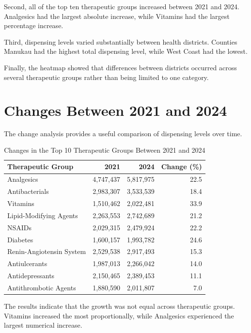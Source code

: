 \documentclass[11pt,a4paper]{report}
\begin{document}
Second, all of the top ten therapeutic groups increased between 2021 and 2024. Analgesics had the largest absolute increase, while Vitamins had the largest percentage increase.

Third, dispensing levels varied substantially between health districts. Counties Manukau had the highest total dispensing level, while West Coast had the lowest.

Finally, the heatmap showed that differences between districts occurred across several therapeutic groups rather than being limited to one category.

\section{Changes Between 2021 and 2024}

The change analysis provides a useful comparison of dispensing levels over time.

\begin{table}[H]
\centering
\caption{Changes in the Top 10 Therapeutic Groups Between 2021 and 2024}
\label{tab:change}
\begin{tabular}{lrrr}
\toprule
\textbf{Therapeutic Group} &
\textbf{2021} &
\textbf{2024} &
\textbf{Change (\%)} \\
\midrule
Analgesics & 4,747,437 & 5,817,975 & 22.5 \\
Antibacterials & 2,983,307 & 3,533,539 & 18.4 \\
Vitamins & 1,510,462 & 2,022,481 & 33.9 \\
Lipid-Modifying Agents & 2,263,553 & 2,742,689 & 21.2 \\
NSAIDs & 2,029,315 & 2,479,924 & 22.2 \\
Diabetes & 1,600,157 & 1,993,782 & 24.6 \\
Renin-Angiotensin System & 2,529,538 & 2,917,493 & 15.3 \\
Antiulcerants & 1,987,013 & 2,266,042 & 14.0 \\
Antidepressants & 2,150,465 & 2,389,453 & 11.1 \\
Antithrombotic Agents & 1,880,590 & 2,011,807 & 7.0 \\
\bottomrule
\end{tabular}
\end{table}

The results indicate that the growth was not equal across therapeutic groups. Vitamins increased the most proportionally, while Analgesics experienced the largest numerical increase.
\end{document}
